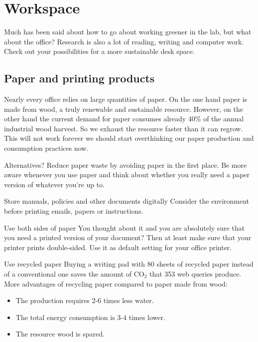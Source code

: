 \section{Workspace}

 Much has been said about how to go about working greener in the lab, but what about the office? Research is also a lot of reading, writing and computer work. Check out your possibilities for a more sustainable desk space. 
 
\subsection{Paper and printing products}
	
	Nearly every office relies on large quantities of paper. On the one hand paper is made from wood, a truly renewable and sustainable resource. However, on the other hand the current demand for paper consumes already 40\% of the annual industrial wood harvest. So we exhaust the resource faster than it can regrow.  \cite{WWF} This will not work forever we should start overthinking our paper production and consumption practices now. 

\begin{suggest}{Alternatives?}
	Reduce paper waste by avoiding paper in the first place. 
	Be more aware whenever you use paper and think about whether you really need a paper version of whatever you're up to.
\end{suggest}

\begin{suggest}{Store manuals, policies and other documents digitally}
		 Consider the environment before printing emails, papers or instructions. 
\end{suggest}

\begin{suggest}{Use both sides of paper}
	You thought about it and you are absolutely sure that you need a printed version of your document? Then at least make sure that your printer prints double-sided. Use it as default setting for your office printer.
\end{suggest}

\begin{suggest}{Use recycled paper}
	Buying a writing pad with 80 sheets of recycled paper instead of a conventional one 
	saves the amount of CO$_2$ that 353 web queries produce.
	More advantages of recycling paper compared to paper made from wood:  
	\begin{itemize}
		\item  The production requires 2-6 times less water.
		\item  The total energy consumption is 3-4 times lower. 
		\item  The resource wood is spared. \cite{Paper}
	\end{itemize}  
\end{suggest}
	
